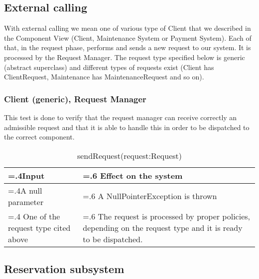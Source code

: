 \documentclass[10pt, a4paper,titlepage]{article}
\begin{document}
\subsection{External calling}
With external calling we mean one of various type of Client that we described in the Component View (Client, Maintenance System or Payment System). Each of that, in the request phase, performs and sends a new request to our system. It is processed by the Request Manager. The request type specified below is generic (abstract superclass) and different types of requests exist (Client has ClientRequest, Maintenance has MaintenanceRequest and so on).
\subsubsection{Client (generic), Request Manager}
This test is done to verify that the request manager can receive correctly an admissible request and that it is able to handle this in order to be dispatched to the correct component.
\begin{table}[h]
\caption{sendRequest(request:Request)}
\begin{tabularx}{\textwidth}{|>{\hsize=.4\hsize}X|>{\hsize=.6\hsize}X|}
\hline
Input & Effect on the system\\
\hline
A null parameter & A NullPointerException is thrown\\ 
\hline
One of the request type cited above & The request is processed by proper policies, depending on the request type and it is ready to be dispatched.\\
\hline
\end{tabularx}
\end{table}
\subsection{Reservation subsystem}
\end{document}
